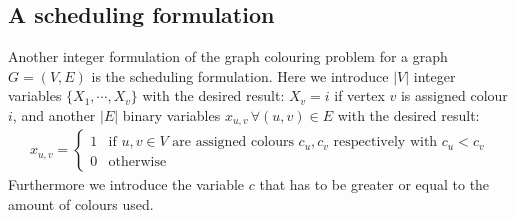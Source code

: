 \subsection{A scheduling formulation}
Another integer formulation of the graph colouring problem for a graph $G=(V,E)$ is the scheduling formulation. Here we introduce $|V|$ integer variables $\{X_1, \cdots, X_v\}$ with the desired result: $X_v = i$ if vertex $v$ is assigned colour $i$, and another $|E|$ binary variables $x_{u,v} \, \forall (u,v)\in E$ with the desired result:
\begin{align}
x_{u,v} = \left\{
\begin{array}{ll}
1 & \text{if }u,v \in V \text{ are assigned colours $c_u,c_v$ respectively with } c_u < c_v \\ 0 & \text{otherwise}
\end{array}\right.
\end{align}
Furthermore we introduce the variable $c$ that has to be greater or equal to the amount of colours used.
